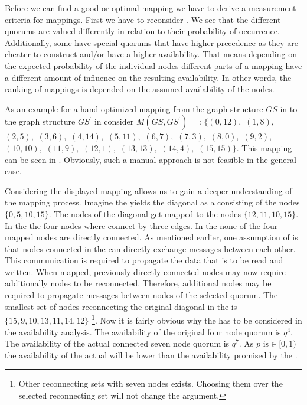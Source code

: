 \documentclass[conference]{IEEEtran}
\begin{document}
Before we can find a good or optimal mapping we have to derive a measurement
criteria for mappings.
First we have to reconsider . 
We see that the different quorums are valued differently in relation to their
probability of occurrence.
Additionally, some  have special quorums that have higher precedence as
they are cheater to construct and/or have a higher availability.
That means depending on the expected probability of the individual nodes
different parts of a mapping have a different amount of influence on the
resulting availability.
In other words, the ranking of mappings is depended on the assumed
availability of the nodes.

As an example for a hand-optimized mapping from the graph structure \(GS\) in
 to the graph structure \(GS^{'}\) in 
consider \(M(GS,GS^{'}) = \):
\(\{(0,12),\) \((1,8),\) \((2,5),\) \((3,6),\) \((4,14),\) \((5,11),\)
\((6,7),\) \((7,3),\) \((8,0),\) \((9,2),\) \((10,10),\) \((11,9),\)
\((12,1),\) \((13,13),\) \((14,4),\) \((15,15)\}\).
This mapping can be seen in .
Obviously, such a manual approach is not feasible in the general case.

Considering the displayed mapping allows us to gain a deeper understanding of
the mapping process.
Imagine the  yields the diagonal as a  consisting of the nodes
\(\{0,5,10,15\}\). 
The nodes of the diagonal get mapped to the nodes \(\{12,11,10,15\}\).
In the  the four nodes where connect by three edges.
In the  none of the four mapped nodes are directly connected.
As mentioned earlier, one assumption of  is that nodes connected in the
 can directly exchange messages between each other.
This communication is required to propagate the data that is to be read and
written.
When mapped, previously directly connected nodes may now require additionally
nodes to be reconnected.
Therefore, additional nodes may be required to propagate messages between
nodes of the selected quorum.
The smallest set of nodes reconnecting the original diagonal  in the
 is \(\{15,9,10,13,11,14,12\}\) \footnote{Other reconnecting sets with
seven nodes exists. Choosing them over the selected reconnecting set will not
change the argument.}.
Now it is fairly obvious why the  has to be considered in the
availability analysis.
The availability of the original four node quorum is \(q^{4}\).
The availability of the actual connected seven node quorum is \(q^{7}\).
As \(p \text{ is}\in [0,1)\) the availability of the actual  will be
lower than the availability promised by the .
\end{document}
